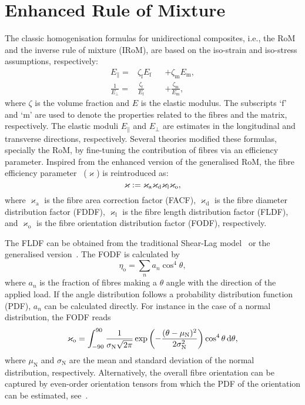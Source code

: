 \section{Enhanced Rule of Mixture}
	The classic homogenisation formulas for unidirectional composites, i.e., the RoM and the inverse rule of mixture (IRoM), are based on the iso-strain and iso-stress assumptions, respectively:
	\begin{subequations}
	\begin{alignat}{2}
		E_\parallel 		=& \zeta_\text{f}E_\text{f}          &&+\zeta_\text{m}E_\text{m},\\
		\frac{1}{E_\perp}	=& \frac{\zeta_\text{f}}{E_\text{f}} &&+ \frac{\zeta_\text{m}}{E_\text{m}},
	\end{alignat}
	\end{subequations}
	where $\zeta$ is the volume fraction and $E$ is the elastic modulus. The subscripts `$\text{f}$' and `$\text{m}$' are used to denote the properties related to the fibres and the matrix, respectively. The elastic moduli $E_\parallel$ and $E_\perp$ are estimates in the longitudinal and transverse directions, respectively. Several theories modified these formulas, specially the RoM, by fine-tuning the contribution of fibres via an efficiency parameter. Inspired from the enhanced version of the generalised RoM, the fibre efficiency parameter~\autocite{Summerscales.2019} ($\varkappa$) is reintroduced as:
	\begin{equation}
		\varkappa \mathrel{:=} \varkappa_\text{a}\varkappa_\text{d}\varkappa_\text{l}\varkappa_\text{o},\label{eq:kappa}
	\end{equation}
	where $\varkappa_\text{a}$ is the fibre area correction factor (FACF), $\varkappa_\text{d}$ is the fibre diameter distribution factor (FDDF), $\varkappa_\text{l}$ is the fibre length distribution factor (FLDF), and $\varkappa_\text{o}$ is the fibre orientation distribution factor (FODF), respectively.
	
	The FLDF can be obtained from the traditional Shear-Lag model~\autocite{Cox.1952} or the generalised version~\autocite{Nairn.2004}. The FODF is calculated by~\autocite{Krenchel.1964}
	\begin{equation}
		\eta_\text{o}=\sum_n a_n\cos^4\theta,\label{eq:krenchel}
	\end{equation}
	where $a_n$ is the fraction of fibres making a $\theta$ angle with the direction of the applied load. If the angle distribution follows a probability distribution function (PDF), $a_n$ can be calculated directly. For instance in the case of a normal distribution, the FODF reads
	\begin{equation}
		\varkappa_\text{o}=\int_{-90}^{90}\frac{1}{\sigma_\text{N}\sqrt{2\pi}} \exp\left(-\frac{(\theta-\mu_\text{N})^2}{2\sigma_\text{N}^2}\right)\cos^4\theta\,\text{d}\theta,
   	\end{equation}
	where $\mu_\text{N}$ and $\sigma_\text{N}$ are the mean and standard deviation of the normal distribution, respectively. Alternatively, the overall fibre orientation can be captured by even-order orientation tensors from which the PDF of the orientation can be estimated, see~\autocite{Javanbakht.2019,Javanbakht.2017c,Advani.1987}.
	
